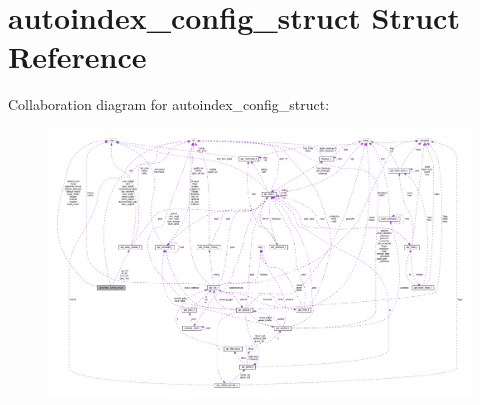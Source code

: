 \hypertarget{structautoindex__config__struct}{}\section{autoindex\+\_\+config\+\_\+struct Struct Reference}
\label{structautoindex__config__struct}


Collaboration diagram for autoindex\+\_\+config\+\_\+struct\+:
\nopagebreak
\begin{figure}[H]
\begin{center}
\leavevmode
\includegraphics[width=350pt]{structautoindex__config__struct__coll__graph}
\end{center}
\end{figure}
